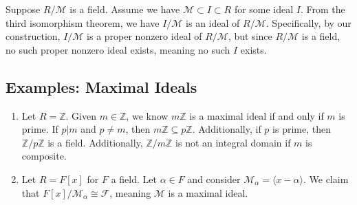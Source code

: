 \documentclass[8pt]{extarticle}
\newcommand{\Z}{\mathbb{Z}}
\begin{document}
  Suppose $R/\mathcal{M}$ is a field. Assume we have $\mathcal{M} \subset I \subset R$ for some ideal $I$. From the third isomorphism theorem, we have $I/\mathcal{M}$ is an ideal of $R/\mathcal{M}$. Specifically, by our construction, $I/\mathcal{M}$ is a proper nonzero ideal of $R/\mathcal{M}$, but since $R/\mathcal{M}$ is a field, no such proper nonzero ideal exists, meaning no such $I$ exists.
  \subsection{Examples: Maximal Ideals}%
  \begin{enumerate}[(1)]
    \item Let $R = \Z$. Given $m\in \Z$, we know $m\Z$ is a maximal ideal if and only if $m$ is prime. If $p|m$ and $p\neq m$, then $m\Z \subseteq p\Z$. Additionally, if $p$ is prime, then $\Z/p\Z$ is a field. Additionally, $\Z/m\Z$ is not an integral domain if $m$ is composite.
    \item Let $R = F[x]$ for $F$ a field. Let $\alpha \in F$ and consider $\mathcal{M}_{\alpha} = \langle x-\alpha\rangle$. We claim that $F[x]/\mathcal{M}_{\alpha} \cong \mathcal{F}$, meaning $\mathcal{M}$ is a maximal ideal.\\


\end{enumerate}
\end{document}
